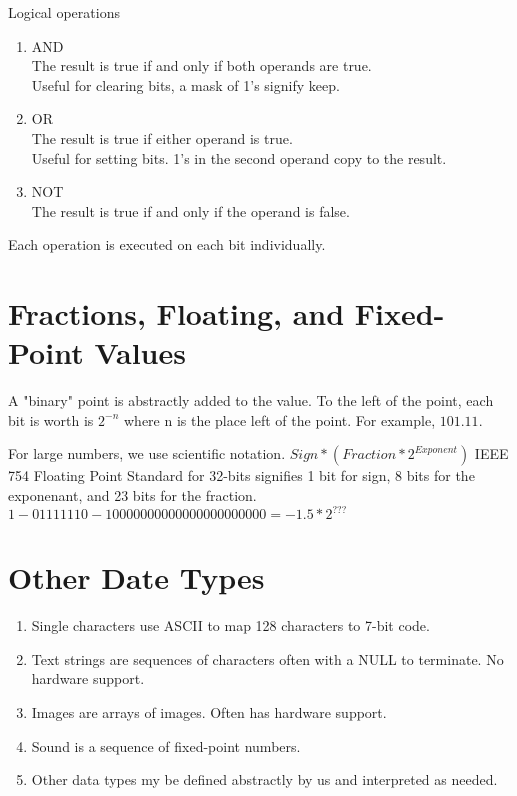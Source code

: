 \documentclass{article}
\begin{document}
Logical operations
\begin{enumerate}
  \item {AND\\The result is true if and only if both operands are true.\\Useful for clearing bits, a mask of 1's signify keep.}
  \item {OR\\The result is true if either operand is true.\\Useful for setting bits. 1's in the second operand copy to the result.}
  \item {NOT\\The result is true if and only if the operand is false.}
\end{enumerate}
\noindent
Each operation is executed on each bit individually.

\section{Fractions, Floating, and Fixed-Point Values}
A "binary" point is abstractly added to the value. To the left of the point, each bit is worth is $2^{-n}$ where n is the place left of the point. For example, $101.11$.

For large numbers, we use scientific notation. $Sign * (Fraction * 2^{Exponent})$
IEEE 754 Floating Point Standard for 32-bits signifies 1 bit for sign, 8 bits for the exponenant, and 23 bits for the fraction.
$1-01111110-10000000000000000000000 = -1.5*2^{???}$

\section{Other Date Types}
\begin{enumerate}
  \item Single characters use ASCII to map 128 characters to 7-bit code.
  \item Text strings are sequences of characters often with a NULL to terminate. No hardware support.
  \item Images are arrays of images. Often has hardware support.
  \item Sound is a sequence of fixed-point numbers.
  \item Other data types my be defined abstractly by us and interpreted as needed.
\end{enumerate}
\end{document}

